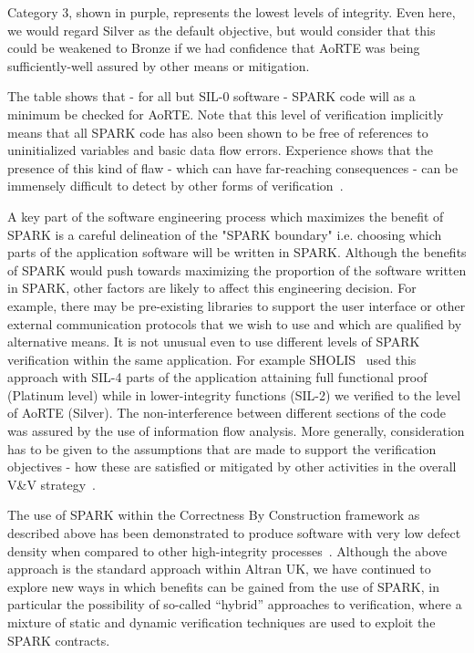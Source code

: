 \documentclass{llncs}
\begin{document}
Category 3, shown in purple, represents the lowest levels of integrity. Even
here, we would regard Silver as the default objective, but would consider that
this could be weakened to Bronze if we had confidence that AoRTE was being
sufficiently-well assured by other means or mitigation.

The table shows that - for all but SIL-0 software - SPARK code will as a
minimum be checked for AoRTE. Note that this level of verification implicitly
means that all SPARK code has also been shown to be free of references to
uninitialized variables and basic data flow errors.  Experience shows that the
presence of this kind of flaw - which can have far-reaching consequences - can
be immensely difficult to detect by other forms of
verification~\cite{King2000TSE}.

A key part of the software engineering process which maximizes the benefit of
SPARK is a careful delineation of the "SPARK boundary" i.e. choosing which
parts of the application software will be written in SPARK. Although the
benefits of SPARK would push towards maximizing the proportion of the software
written in SPARK, other factors are likely to affect this engineering
decision. For example, there may be pre-existing libraries to support the user
interface or other external communication protocols that we wish to use and
which are qualified by alternative means. It is not unusual even to use
different levels of SPARK verification within the same application. For example
SHOLIS~\cite{Croxford2005Manifesto} used this approach with SIL-4 parts of the
application attaining full functional proof (Platinum level) while in
lower-integrity functions (SIL-2) we verified to the level of AoRTE
(Silver). The non-interference between different sections of the code was
assured by the use of information flow analysis. More generally, consideration
has to be given to the assumptions that are made to support the verification
objectives - how these are satisfied or mitigated by other activities in the
overall V\&V strategy~\cite{kanig2014tap}.

The use of SPARK within the Correctness By Construction framework as described
above has been demonstrated to produce software with very low defect density
when compared to other high-integrity
processes~\cite{Croxford2005Manifesto}. Although the above approach is the
standard approach within Altran UK, we have continued to explore new ways in
which benefits can be gained from the use of SPARK, in particular the
possibility of so-called ``hybrid'' approaches to verification, where a mixture
of static and dynamic verification techniques are used to exploit the SPARK
contracts.
\end{document}
